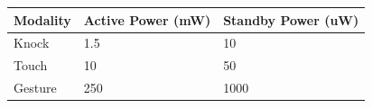 \begin{tabular}{lll}
\toprule
Modality & Active Power (mW) & Standby Power (uW) \\
\midrule
Knock & 1.5 & 10 \\
Touch & 10 & 50 \\
Gesture & 250 & 1000 \\
\bottomrule
\end{tabular}
